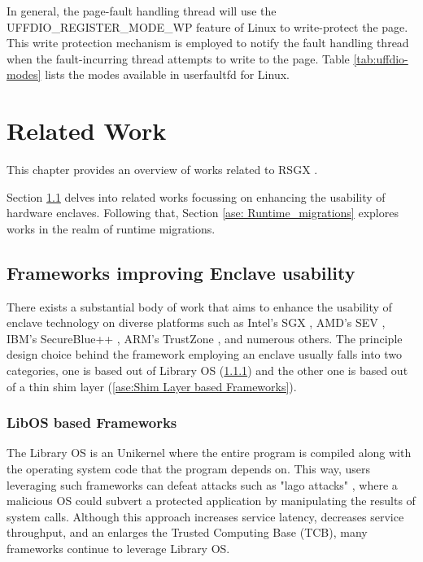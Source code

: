 \documentclass[article, doublespace,nopageskip]{VTthesis} %
\newcommand{\monitor}{RSGX \xspace}
\begin{document}
     In general, the page-fault handling thread will use the UFFDIO\_REGISTER\_MODE\_WP feature of Linux to write-protect the page. This write protection mechanism is employed to notify the fault handling thread when the fault-incurring thread attempts to write to the page. Table \ref{tab:uffdio-modes} lists the modes available in userfaultfd for Linux.
     
    \chapter{Related Work} \label{ch:rel_works}
    This chapter provides an overview of works related to \monitor. 
    
    Section \ref{ase:frameworks_to_improve_usability} delves into related works focussing on enhancing the usability of hardware enclaves. Following that, Section \ref{ase: Runtime_migrations} explores works in the realm of runtime migrations.

    \section{Frameworks improving Enclave usability} \label{ase:frameworks_to_improve_usability}
    There exists a substantial body of work that aims to enhance the usability of enclave technology on diverse platforms such as Intel's SGX \cite{Intel-SGX}, AMD's SEV \cite{AMD-SEV}, IBM's SecureBlue++ \cite{IBM-Secure_Blue}, ARM's TrustZone \cite{ARM-TrustZone}, and numerous others. The principle design choice behind the framework employing an enclave usually falls into two categories, one is based out of Library OS (\ref{ase:LibOS based Frameworks}) and the other one is based out of a thin shim layer (\ref{ase:Shim Layer based Frameworks}). 

    \subsection{LibOS based Frameworks} \label{ase:LibOS based Frameworks}
    The Library OS is an Unikernel \cite{Unikernel} where the entire program is compiled along with the operating system code that the program depends on. This way, users leveraging such frameworks can defeat attacks such as "lago attacks" \cite{lago}, where a malicious OS could subvert a protected application by manipulating the results of system calls. Although this approach increases service latency, decreases service throughput, and an enlarges the Trusted Computing Base (TCB), many frameworks continue to leverage Library OS.
\end{document}
